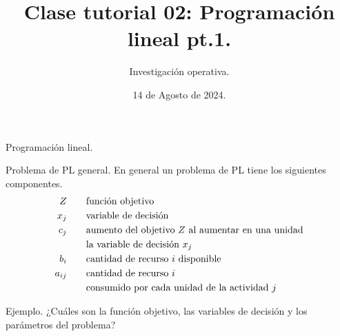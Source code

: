 \documentclass{beamer}
\title[]{Clase tutorial 02: Programación lineal pt.1.}
\date{14 de Agosto de 2024.}
\author[]{ Investigación operativa.
  }
\institute{Universidad de San Andrés}
\begin{document}
\maketitle

\begin{frame}[fragile]{Programación lineal.}
  
\end{frame}

\begin{frame}[fragile]{Problema de PL general.}
  En general un problema de PL tiene los siguientes componentes.
  \begin{align*} \LARGE  
    Z  & \quad \quad \text{función objetivo} \\ 
    x_{j}  & \quad \quad \text{variable de decisión} \\
    c_{j}  & \quad \quad \text{aumento del objetivo $Z$ al aumentar en una unidad} \\
    & \quad \quad \text{la variable de decisión $x_{j}$} \\
    b_{i}  & \quad \quad \text{cantidad de recurso $i$ disponible} \\
    a_{ij}  & \quad \quad \text{cantidad de recurso $i$} \\
    & \quad \quad \text{consumido por cada unidad de la actividad $j$}
  \end{align*}
\end{frame}

\begin{frame}[fragile]{Ejemplo.}
  \pause 
  \alert{¿Cuáles son la función objetivo, las variables de decisión y los parámetros del problema?}
\end{frame}
\end{document}
